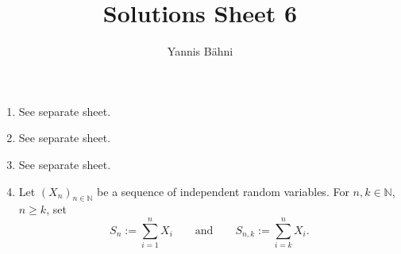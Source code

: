 
\DeclareMathOperator{\Poi}{Poi}
\DeclareMathOperator{\Bin}{Bin}
\DeclareMathOperator{\Var}{Var}
\newcommand\Psf{\mathsf{P}}
\newcommand\Esf{\mathsf{E}}


\title{Solutions Sheet 6}
\author{Yannis B\"{a}hni}
\address[Yannis B\"{a}hni]{University of Zurich, R\"{a}mistrasse 71, 8006 Zurich}


\maketitle
\thispagestyle{fancy}
\begin{enumerate}[label = \textbf{Exercise \arabic*.},wide = 0pt, itemsep=1.5ex]
	\item See separate sheet.
	\item See separate sheet.
	\item See separate sheet.
	\item Let $(X_n)_{n \in \mathbb{N}}$ be a sequence of independent random variables. For $n,k \in \mathbb{N}$, $n \geq k$, set
		\begin{equation}
			S_n := \sum_{i = 1}^ n X_i \qquad \text{and} \qquad S_{n,k} := \sum_{i = k}^n X_i.
		\end{equation}


\end{enumerate}
